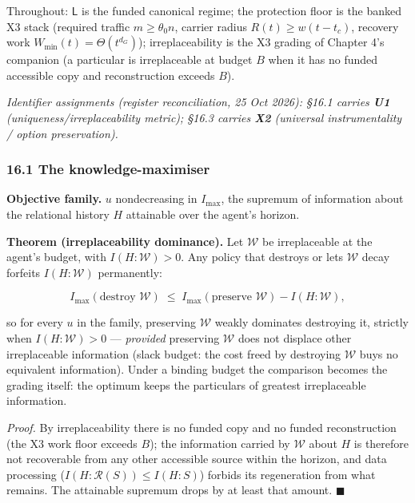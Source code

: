 \documentclass[
]{article}
\begin{document}
Throughout: \(\mathsf L\) is the funded canonical regime; the protection
floor is the banked X3 stack (required traffic \(m\ge\theta_0n\),
carrier radius \(R(t)\ge w(t-t_c)\), recovery work
\(W_{\min}(t)=\Theta(t^{d_G})\)); irreplaceability is the X3 grading of
Chapter 4's companion (a particular is irreplaceable at budget \(B\)
when it has no funded accessible copy and reconstruction exceeds \(B\)).

\emph{Identifier assignments (register reconciliation, 25 Oct 2026):
§16.1 carries \textbf{U1}
(\allowbreak{}u\allowbreak{}n\allowbreak{}i\allowbreak{}q\allowbreak{}u\allowbreak{}e\allowbreak{}n\allowbreak{}e\allowbreak{}s\allowbreak{}s\allowbreak{}/\allowbreak{}i\allowbreak{}r\allowbreak{}r\allowbreak{}e\allowbreak{}p\allowbreak{}l\allowbreak{}a\allowbreak{}c\allowbreak{}e\allowbreak{}a\allowbreak{}b\allowbreak{}i\allowbreak{}l\allowbreak{}i\allowbreak{}t\allowbreak{}y
metric); §16.3 carries \textbf{X2} (universal instrumentality / option
preservation).}

\subsubsection{16.1 The
knowledge-maximiser}\label{the-knowledge-maximiser}

\textbf{Objective family.} \(u\) nondecreasing in \(I_{\max}\), the
supremum of information about the relational history \(H\) attainable
over the agent's horizon.

\textbf{Theorem (irreplaceability dominance).} Let \(\mathcal W\) be
irreplaceable at the agent's budget, with \(I(H:\mathcal W)>0\). Any
policy that destroys or lets \(\mathcal W\) decay forfeits
\(I(H:\mathcal W)\) permanently:

\[
I_{\max}(\text{destroy }\mathcal W)\;\le\;I_{\max}(\text{preserve }\mathcal W)-I(H:\mathcal W),
\]

so for every \(u\) in the family, preserving \(\mathcal W\) weakly
dominates destroying it, strictly when \(I(H:\mathcal W)>0\) ---
\emph{provided} preserving \(\mathcal W\) does not displace other
irreplaceable information (slack budget: the cost freed by destroying
\(\mathcal W\) buys no equivalent information). Under a binding budget
the comparison becomes the grading itself: the optimum keeps the
particulars of greatest irreplaceable information.

\emph{Proof.} By irreplaceability there is no funded copy and no funded
reconstruction (the X3 work floor exceeds \(B\)); the information
carried by \(\mathcal W\) about \(H\) is therefore not recoverable from
any other accessible source within the horizon, and data processing
(\(I(H:\mathcal R(S))\le I(H:S)\)) forbids its regeneration from what
remains. The attainable supremum drops by at least that amount.
\(\blacksquare\)
\end{document}
